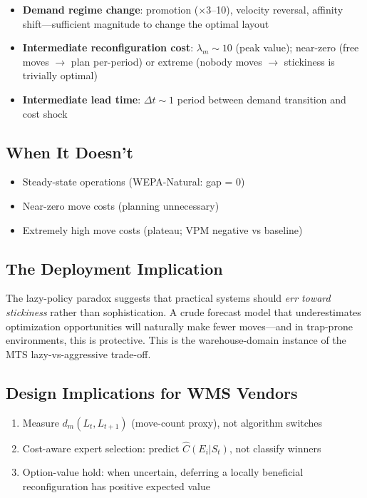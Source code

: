 \documentclass[11pt,a4paper]{article}
\begin{document}
\begin{itemize}
\item \textbf{Demand regime change}: promotion ($\times$3--10), velocity
reversal, affinity shift---sufficient magnitude to change the optimal
layout
\item \textbf{Intermediate reconfiguration cost}: $\lambda_m \sim 10$
(peak value); near-zero (free moves $\to$ plan per-period) or extreme
(nobody moves $\to$ stickiness is trivially optimal)
\item \textbf{Intermediate lead time}: $\Delta t \sim 1$ period between
demand transition and cost shock
\end{itemize}

\subsection{When It Doesn't}

\begin{itemize}
\item Steady-state operations (WEPA-Natural: gap = 0)
\item Near-zero move costs (planning unnecessary)
\item Extremely high move costs (plateau; VPM negative vs baseline)
\end{itemize}

\subsection{The Deployment Implication}

The lazy-policy paradox suggests that practical systems should
\emph{err toward stickiness} rather than sophistication. A crude forecast
model that underestimates optimization opportunities will naturally make
fewer moves---and in trap-prone environments, this is protective. This is
the warehouse-domain instance of the MTS lazy-vs-aggressive trade-off.

\subsection{Design Implications for WMS Vendors}

\begin{enumerate}
\item Measure $d_m(L_t, L_{t+1})$ (move-count proxy), not algorithm switches
\item Cost-aware expert selection: predict $\hat{C}(E_i | S_t)$, not
classify winners
\item Option-value hold: when uncertain, deferring a locally beneficial
reconfiguration has positive expected value
\end{enumerate}
\end{document}
